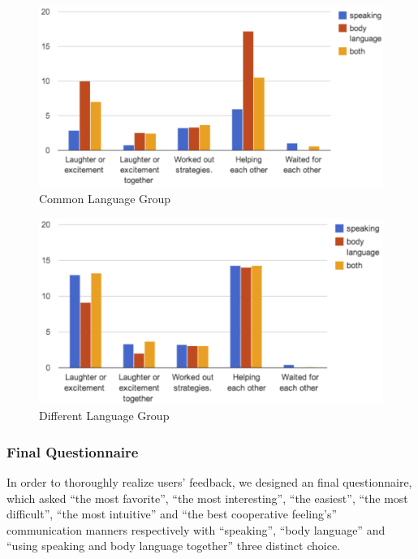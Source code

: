 

\begin{figure}[!h]
\centering
\includegraphics[width=0.9\columnwidth]{Figures/US_CPMs_Com.png}
\caption{Common Language Group}
\label{fig:US_CPMs_Com}
\end{figure}

\begin{figure}[!h]
\centering
\includegraphics[width=0.9\columnwidth]{Figures/US_CPMs_Dif.png}
\caption{Different Language Group}
\label{fig:US_CPMs_Dif}
\end{figure}


\subsubsection{Final Questionnaire}
In order to thoroughly realize users' feedback, we designed an final questionnaire, which asked ``the most favorite'', ``the most interesting'', ``the easiest'', ``the most difficult'', ``the most intuitive'' and ``the best cooperative feeling's'' communication manners respectively with ``speaking'', ``body language'' and ``using speaking and body language together'' three distinct choice.

